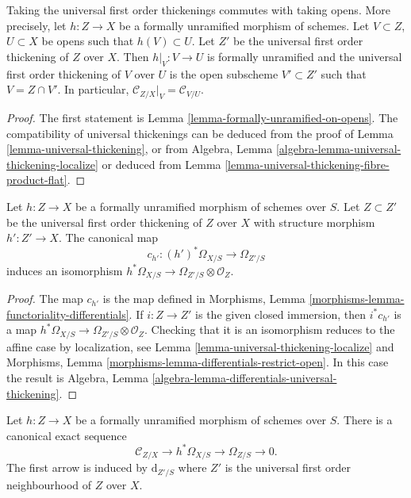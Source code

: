 \begin{lemma}
\label{lemma-universal-thickening-localize}
Taking the universal first order thickenings commutes with taking opens.
More precisely, let $h : Z \to X$ be a formally unramified morphism of schemes.
Let $V \subset Z$, $U \subset X$ be opens such that $h(V) \subset U$.
Let $Z'$ be the universal first order thickening of $Z$ over $X$.
Then $h|_V : V \to U$ is formally unramified and the universal first
order thickening of $V$ over $U$ is the open subscheme $V' \subset Z'$
such that $V = Z \cap V'$. In particular,
$\mathcal{C}_{Z/X}|_V = \mathcal{C}_{V/U}$.
\end{lemma}

\begin{proof}
The first statement is
Lemma \ref{lemma-formally-unramified-on-opens}.
The compatibility of universal thickenings can be deduced from the proof of
Lemma \ref{lemma-universal-thickening},
or from
Algebra, Lemma \ref{algebra-lemma-universal-thickening-localize}
or deduced from
Lemma \ref{lemma-universal-thickening-fibre-product-flat}.
\end{proof}

\begin{lemma}
\label{lemma-differentials-universally-unramified}
Let $h : Z \to X$ be a formally unramified morphism of schemes over $S$.
Let $Z \subset Z'$ be the universal first order thickening of $Z$
over $X$ with structure morphism $h' : Z' \to X$. The canonical map
$$
c_{h'} : (h')^*\Omega_{X/S} \longrightarrow \Omega_{Z'/S}
$$
induces an isomorphism
$h^*\Omega_{X/S} \to \Omega_{Z'/S} \otimes \mathcal{O}_Z$.
\end{lemma}

\begin{proof}
The map $c_{h'}$ is the map defined in
Morphisms, Lemma \ref{morphisms-lemma-functoriality-differentials}.
If $i : Z \to Z'$ is the given closed immersion, then
$i^*c_{h'}$ is a map
$h^*\Omega_{X/S} \to \Omega_{Z'/S} \otimes \mathcal{O}_Z$.
Checking that it is an isomorphism reduces to the affine case
by localization, see
Lemma \ref{lemma-universal-thickening-localize}
and
Morphisms, Lemma \ref{morphisms-lemma-differentials-restrict-open}.
In this case the result is
Algebra, Lemma \ref{algebra-lemma-differentials-universal-thickening}.
\end{proof}

\begin{lemma}
\label{lemma-universally-unramified-differentials-sequence}
Let $h : Z \to X$ be a formally unramified morphism of schemes over $S$.
There is a canonical exact sequence
$$
\mathcal{C}_{Z/X} \to h^*\Omega_{X/S} \to \Omega_{Z/S} \to 0.
$$
The first arrow is induced by $\text{d}_{Z'/S}$ where
$Z'$ is the universal first order neighbourhood of $Z$ over $X$.
\end{lemma}

